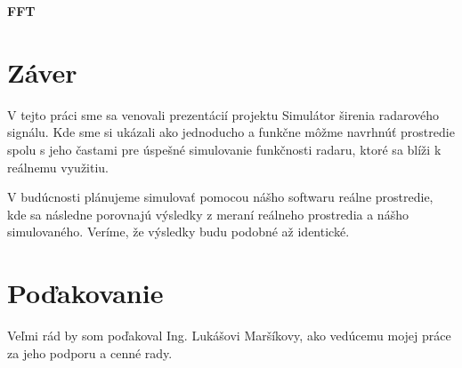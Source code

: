 \documentclass[slovak]{ExcelAtFIT} %
\begin{document}
    \textbf{FFT}

\section{Záver}
\label{sec:Conclusions}

V tejto práci sme sa venovali prezentácií projektu Simulátor širenia radarového signálu. Kde sme si ukázali ako jednoducho a funkčne môžme navrhnúť prostredie spolu s jeho častami pre úspešné simulovanie funkčnosti radaru, ktoré sa blíži k reálnemu využitiu.

V budúcnosti plánujeme simulovať pomocou nášho softwaru reálne prostredie, kde sa následne porovnajú výsledky z meraní reálneho prostredia a nášho simulovaného. Veríme, že výsledky budu podobné až identické.


\section*{Poďakovanie}
Veľmi rád by som poďakoval Ing. Lukášovi Maršíkovy, ako vedúcemu mojej práce za jeho podporu a cenné rady.



\end{document}

